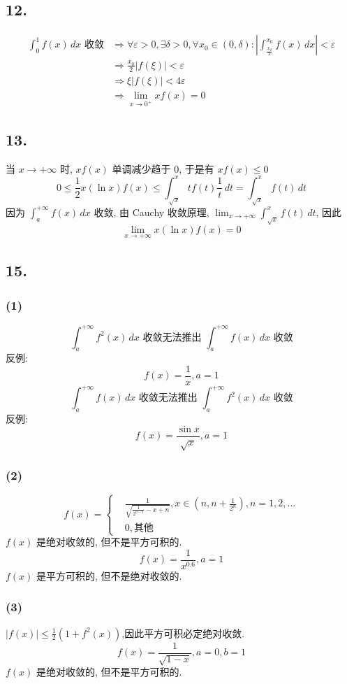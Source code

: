 \documentclass[12pt, a4paper, oneside]{ctexart}
\begin{document}
        \subsection*{12.}
            $$
                \begin{aligned}
                    \int_{0}^{1}f(x)\,dx\text{ 收敛}&\Rightarrow \forall \varepsilon > 0, \exists \delta > 0, \forall x_0\in (0, \delta): |\int_{\frac{x_0}{2}}^{x_0}f(x)\,dx|<\varepsilon\\
                    &\Rightarrow \frac{x_0}{2}|f(\xi)|<\varepsilon\\
                    &\Rightarrow \xi|f(\xi)|<4\varepsilon\\
                    &\Rightarrow \lim_{x\to 0^{+}}xf(x)=0
                \end{aligned}
            $$
        \subsection*{13.}
            当 $x\to +\infty$ 时, $xf(x)$ 单调减少趋于 $0$, 于是有 $xf(x)\leq 0$
            $$
                0\leq \frac12x(\ln x)f(x)\leq\int_{\sqrt{x}}^{x}tf(t)\frac1t\,dt=\int_{\sqrt{x}}^{x}f(t)\,dt
            $$
            因为 $\int_{a}^{+\infty}f(x)\,dx$ 收敛, 由 Cauchy 收敛原理, $\lim_{x\to+\infty}\int_{\sqrt x}^{x}f(t)\,dt$, 因此
            $$
                \lim_{x\to+\infty}x(\ln x)f(x)=0
            $$
        \subsection*{15.}
            \subsubsection*{(1)}
                $$
                    \int_{a}^{+\infty} f^2(x)\,dx\text{ 收敛无法推出 } \int_{a}^{+\infty} f(x)\,dx \text{ 收敛}
                $$
                反例:
                $$
                    f(x)=\frac1x,a=1
                $$
                $$
                    \int_{a}^{+\infty} f(x)\,dx\text{ 收敛无法推出 } \int_{a}^{+\infty} f^2(x)\,dx \text{ 收敛}
                $$
                反例:
                $$
                    f(x)=\frac{\sin x}{\sqrt{x}},a=1
                $$
            \subsubsection*{(2)}
                $$
                    f(x)=\left\{\begin{aligned}
                        &\frac{1}{\sqrt{\frac{1}{2^{n-1}}-x+n}}, x\in (n,n+\frac{1}{2^n}),n=1,2,...\\
                        &0, \text{其他}
                    \end{aligned}\right.
                $$
                $f(x)$ 是绝对收敛的, 但不是平方可积的.
                $$
                    f(x)=\frac{1}{x^{0.6}},a=1
                $$
                $f(x)$ 是平方可积的, 但不是绝对收敛的.
            \subsubsection*{(3)}
                $|f(x)|\leq \frac12(1+f^2(x))$,因此平方可积必定绝对收敛.
                $$
                    f(x)=\frac{1}{\sqrt{1-x}},a=0,b=1
                $$
                $f(x)$ 是绝对收敛的, 但不是平方可积的.
\end{document}
